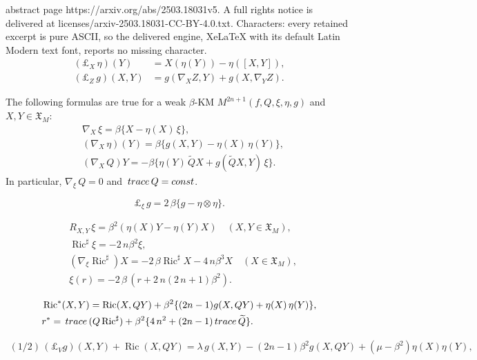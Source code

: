 \documentclass[10pt,a4paper]{amsart}
\def\Ric{\operatorname{Ric}}
\def\tr{{\rm\,trace\,}}
\begin{document}
abstract page https://arxiv.org/abs/2503.18031v5. A full rights notice is delivered at licenses/arxiv-2503.18031-CC-BY-4.0.txt. Characters: every retained excerpt is pure ASCII, so the delivered engine, XeLaTeX with its default Latin Modern text font, reports no missing character.
\begin{align}\label{3.3B}
 (\pounds_{X}\,\eta)(Y) & = X(\eta(Y)) - \eta([X, Y]) ,\\
 \label{3.3C}
 (\pounds_{Z}\,g)(X,Y) & = g(\nabla_X Z, Y) + g(X, \nabla_Y Z).
\end{align}

\begin{lemma}
The following formulas are true for a weak $\beta$-KM $M^{2n+1}(f,Q,\xi,\eta,g)$ and $X,Y\in\mathfrak{X}_M$:
\begin{align}\label{2.3b}
 & \nabla_{X}\,\xi = \beta\{X -\eta(X)\,\xi\}, \\
\label{2.3c}
 & (\nabla_{X}\,\eta)(Y) = \beta\{g(X,Y) -\eta(X)\,\eta(Y)\} ,\\
 \label{E-nS-10b}
 & (\nabla_X\,Q)Y = -\beta\big\{\eta(Y)\,\widetilde Q X + g(\widetilde Q X, Y)\,\xi\big\} .
\end{align}
In particular, $\nabla_\xi\,Q=0$ and $\tr Q=const$.
\end{lemma}

\begin{equation}\label{2.3d}
 \pounds_\xi\,g = 2\,\beta\{g - \eta\otimes\eta\} .
\end{equation}

\begin{align}\label{2.4}
 & R_{X, Y}\,\xi = \beta^2(\eta(X)Y - \eta(Y)X)\quad (X,Y\in\mathfrak{X}_M),\\
\label{2.5-patra}
 & \Ric^\sharp \xi = -2\,n\beta^2\xi ,\\
 \label{E-L-02b}
 & (\nabla_\xi\Ric^\sharp) X = -2\,\beta\Ric^\sharp X -4\,n\beta^3 X \quad (X\in\mathfrak{X}_M) ,\\
\label{3.1A-patra}
 &\xi({r}) = -2\,\beta\,({r}+2\,n(2\,n+1)\beta^2) .
\end{align}

\begin{align}\label{E-ast-Ric}
  & \Ric^\ast(X,Y) = \Ric(X,QY) + \beta^2\{(2n-1) g(X,QY) + \eta(X)\,\eta(Y)\},\\
\label{E-ast-scal}
  & {r}^\ast = \tr(Q\Ric^\sharp)
  + \beta^2\{4\,n^2 + (2n-1)\tr\widetilde Q\} .
\end{align}

\begin{align}\label{E-sol-eta2}
 (1/2)\,(\pounds_V g)(X,Y) + \Ric(X,QY) = \lambda\,g(X,Y) - (2n-1)\beta^2 g(X,QY) + (\mu-\beta^2)\eta(X)\eta(Y) ,
\end{align}
\end{document}
